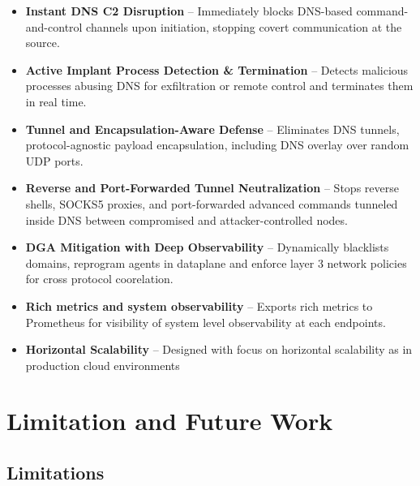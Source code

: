 \documentclass [11pt, proquest] {uwthesis}[2020/02/24]
\begin{document}
\begin{itemize}[itemsep=1pt,parsep=0pt]
    \item \textbf{Instant DNS C2 Disruption} – Immediately blocks DNS-based command-and-control channels upon initiation, stopping covert communication at the source.

    \item \textbf{Active Implant Process Detection \& Termination} – Detects malicious processes abusing DNS for exfiltration or remote control and terminates them in real time.

    \item \textbf{Tunnel and Encapsulation-Aware Defense} – Eliminates DNS tunnels, protocol-agnostic payload encapsulation, including DNS overlay over random UDP ports.

    \item \textbf{Reverse and Port-Forwarded Tunnel Neutralization} – Stops reverse shells, SOCKS5 proxies, and port-forwarded advanced commands tunneled inside DNS between compromised and attacker-controlled nodes.

    \item \textbf{DGA Mitigation with Deep Observability} – Dynamically blacklists  domains, reprogram agents in dataplane and enforce layer 3 network policies for cross protocol coorelation.

    \item \textbf{Rich metrics and system observability} – Exports rich metrics to Prometheus for visibility of system level observability at each endpoints.

    \item \textbf{Horizontal Scalability} – Designed with focus on horizontal scalability as in production cloud environments 

\end{itemize}

\section{Limitation and Future Work}

\subsection*{Limitations}
\end{document}
